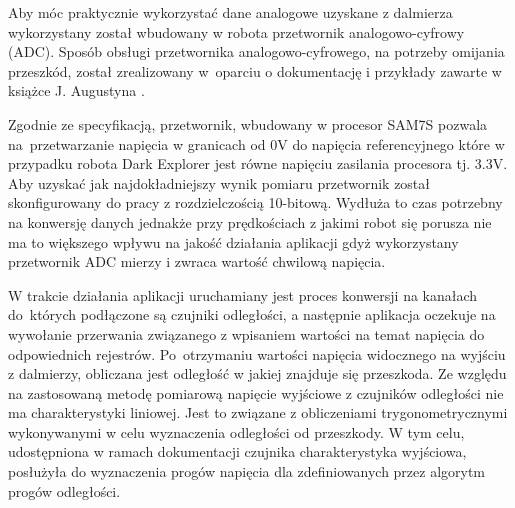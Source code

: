Aby móc praktycznie wykorzystać dane analogowe uzyskane z dalmierza wykorzystany
został wbudowany w robota przetwornik analogowo-cyfrowy (ADC). Sposób obsługi
przetwornika analogowo-cyfrowego, na potrzeby omijania przeszkód, został
zrealizowany w~oparciu o dokumentację i przykłady zawarte w książce J. Augustyna
\cite{JAugustyn}. 

Zgodnie ze specyfikacją, przetwornik, wbudowany w procesor
SAM7S pozwala na~przetwarzanie napięcia w granicach od 0V do napięcia referencyjnego
które w przypadku robota Dark Explorer jest równe napięciu zasilania procesora
tj. 3.3V. Aby uzyskać jak najdokładniejszy wynik pomiaru
przetwornik został skonfigurowany do pracy z rozdzielczością 10-bitową. Wydłuża to czas potrzebny na
konwersję danych jednakże przy prędkościach z jakimi robot się porusza nie ma to
większego wpływu na jakość działania aplikacji gdyż wykorzystany przetwornik
ADC mierzy i zwraca wartość chwilową napięcia\cite{JAugustyn}.

W trakcie działania aplikacji uruchamiany jest proces konwersji na kanałach do~których podłączone są czujniki odległości, a następnie aplikacja oczekuje na
wywołanie przerwania związanego z wpisaniem wartości na temat napięcia do
odpowiednich rejestrów. Po~otrzymaniu wartości napięcia widocznego na wyjściu z
dalmierzy, obliczana jest odległość w jakiej znajduje się przeszkoda. Ze względu
na zastosowaną metodę pomiarową napięcie wyjściowe z czujników odległości nie ma
charakterystyki liniowej. Jest to związane z obliczeniami trygonometrycznymi
wykonywanymi w celu wyznaczenia odległości od przeszkody. 
W tym celu, udostępniona w ramach dokumentacji czujnika\cite{GP2D12DataSheet} charakterystyka
wyjściowa, posłużyła do wyznaczenia progów napięcia dla zdefiniowanych przez
algorytm progów odległości.

